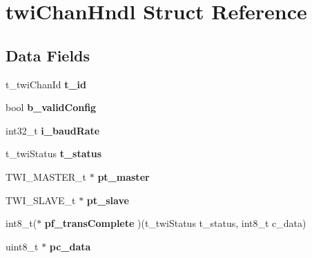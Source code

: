 \hypertarget{structtwi_chan_hndl}{\section{twi\-Chan\-Hndl Struct Reference}
\label{structtwi_chan_hndl}
}
\subsection*{Data Fields}
\begin{DoxyCompactItemize}
\item 
\hypertarget{structtwi_chan_hndl_a5c7a43eb404ec7b78d9221c5d9d1c3a2}{t\-\_\-twi\-Chan\-Id {\bfseries t\-\_\-id}}\label{structtwi_chan_hndl_a5c7a43eb404ec7b78d9221c5d9d1c3a2}

\item 
\hypertarget{structtwi_chan_hndl_a73c33a12d6cfbcd5768be5bddef10c27}{bool {\bfseries b\-\_\-valid\-Config}}\label{structtwi_chan_hndl_a73c33a12d6cfbcd5768be5bddef10c27}

\item 
\hypertarget{structtwi_chan_hndl_a6616035bfad2a509244b7fc44e8604b5}{int32\-\_\-t {\bfseries i\-\_\-baud\-Rate}}\label{structtwi_chan_hndl_a6616035bfad2a509244b7fc44e8604b5}

\item 
\hypertarget{structtwi_chan_hndl_ad9eefd3e8a8ad431fefa568fbf91a174}{t\-\_\-twi\-Status {\bfseries t\-\_\-status}}\label{structtwi_chan_hndl_ad9eefd3e8a8ad431fefa568fbf91a174}

\item 
\hypertarget{structtwi_chan_hndl_a88a57ff5e6ec86967a938af85b53f91b}{T\-W\-I\-\_\-\-M\-A\-S\-T\-E\-R\-\_\-t $\ast$ {\bfseries pt\-\_\-master}}\label{structtwi_chan_hndl_a88a57ff5e6ec86967a938af85b53f91b}

\item 
\hypertarget{structtwi_chan_hndl_adc789d659d4a05a18d4e4dbd84dd305b}{T\-W\-I\-\_\-\-S\-L\-A\-V\-E\-\_\-t $\ast$ {\bfseries pt\-\_\-slave}}\label{structtwi_chan_hndl_adc789d659d4a05a18d4e4dbd84dd305b}

\item 
\hypertarget{structtwi_chan_hndl_a0761c7b5d5429003e826a2262ac4591c}{int8\-\_\-t($\ast$ {\bfseries pf\-\_\-trans\-Complete} )(t\-\_\-twi\-Status t\-\_\-status, int8\-\_\-t c\-\_\-data)}\label{structtwi_chan_hndl_a0761c7b5d5429003e826a2262ac4591c}

\item 
\hypertarget{structtwi_chan_hndl_a29a02ec10a98cd9cdef9aa7c5b63c8bd}{uint8\-\_\-t $\ast$ {\bfseries pc\-\_\-data}}\label{structtwi_chan_hndl_a29a02ec10a98cd9cdef9aa7c5b63c8bd}


\end{DoxyCompactItemize}

